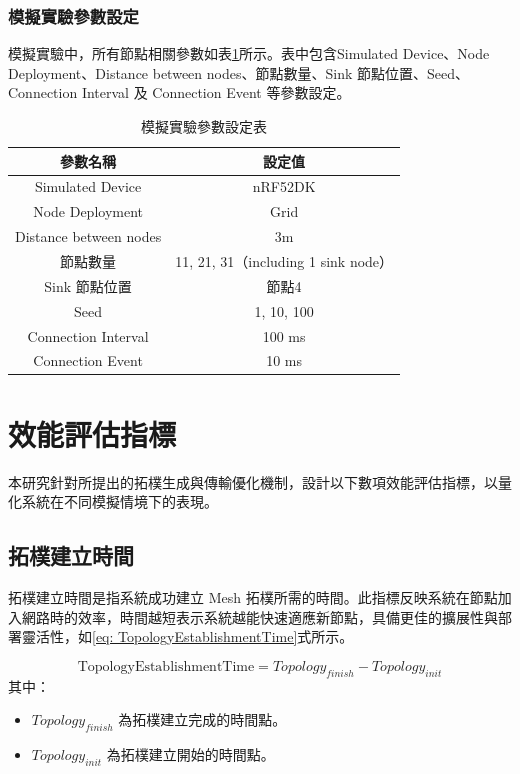 \begin{ZhChapter}
\subsubsection{模擬實驗參數設定}
模擬實驗中，所有節點相關參數如表\ref{tab: 模擬實驗參數設定表}所示。表中包含Simulated Device、Node Deployment、Distance between nodes、節點數量、Sink 節點位置、Seed、Connection Interval 及 Connection Event 等參數設定。

\begin{table}[H]
    \centering
    \caption{模擬實驗參數設定表}
    \label{tab: 模擬實驗參數設定表}
    \begin{tabular}{|c|c|}
        \hline
        參數名稱 & 設定值 \\
        \hline
        Simulated Device & nRF52DK \\
        \hline
        Node Deployment & Grid \\
        \hline
        Distance between nodes & 3m \\
        \hline
        節點數量 & 11, 21, 31（including 1 sink node） \\
        \hline
        Sink 節點位置 & 節點4 \\
        \hline
        Seed & 1, 10, 100 \\
        \hline
        Connection Interval & 100 ms \\
        \hline
        Connection Event &  10 ms  \\
        \hline
    \end{tabular}
\end{table}

\section{效能評估指標}
本研究針對所提出的拓樸生成與傳輸優化機制，設計以下數項效能評估指標，以量化系統在不同模擬情境下的表現。

\subsection{拓樸建立時間}
拓樸建立時間是指系統成功建立 Mesh 拓樸所需的時間。此指標反映系統在節點加入網路時的效率，時間越短表示系統越能快速適應新節點，具備更佳的擴展性與部署靈活性，如\ref{eq: TopologyEstablishmentTime}式所示。

\begin{equation}
\label{eq: TopologyEstablishmentTime}
\text{TopologyEstablishmentTime} = Topology_{finish} - Topology_{init}
\end{equation}
其中：
\begin{itemize}
    \item $Topology_{finish}$ 為拓樸建立完成的時間點。
    \item $Topology_{init}$ 為拓樸建立開始的時間點。
\end{itemize}


\end{ZhChapter}
